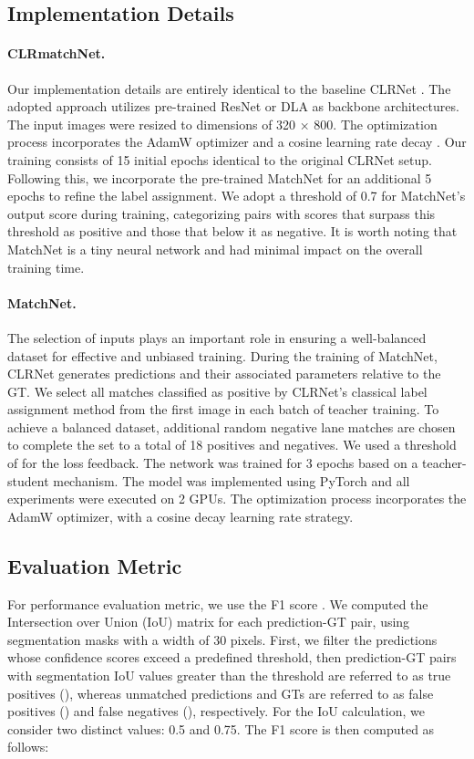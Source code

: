 \documentclass[10pt,twocolumn,letterpaper]{article}
\begin{document}
\subsection{Implementation Details}
\paragraph{CLRmatchNet.}Our implementation details are entirely identical to the baseline CLRNet \cite{CLRNet}. The adopted approach utilizes pre-trained ResNet \cite{resnet} or DLA \cite{DLA} as backbone architectures. The input images were resized to dimensions of 320 × 800. The optimization process incorporates the AdamW \cite{Adam} optimizer and a cosine learning rate decay \cite{Decay}. Our training consists of 15 initial epochs identical to the original CLRNet setup. Following this, we incorporate the pre-trained MatchNet for an additional 5 epochs to refine the label assignment. We adopt a threshold of 0.7 for MatchNet's output score during training, categorizing pairs with scores that surpass this threshold as positive and those that below it as negative. It is worth noting that MatchNet is a tiny neural network and had minimal impact on the overall training time.
 
\paragraph{\textbf{MatchNet.}} The selection of inputs plays an important role in ensuring a well-balanced dataset for effective and unbiased training. During the training of MatchNet, CLRNet generates predictions and their associated parameters relative to the GT. We select all matches classified as positive by CLRNet's classical label assignment method from the first image in each batch of teacher training. To achieve a balanced dataset, additional random negative lane matches are chosen to complete the set to a total of 18 positives and negatives. We used a threshold of  for the loss feedback. The network was trained for 3 epochs based on a teacher-student mechanism. The model was implemented using PyTorch and all experiments were executed on 2 GPUs. The optimization process incorporates the AdamW optimizer, with a cosine decay learning rate strategy. 
 
\subsection{\textbf{Evaluation Metric}} 
For performance evaluation metric, we use the F1 score \cite{CULane_F1}. We computed the Intersection over Union (IoU) matrix for each prediction-GT pair, using segmentation masks with a width of 30 pixels. First, we filter the predictions whose confidence scores exceed a predefined threshold, then prediction-GT pairs with segmentation IoU values greater than the threshold   are referred to as true positives (), whereas unmatched predictions and GTs are referred to as false positives () and false negatives (), respectively. For the IoU calculation, we consider two distinct  values: 0.5 and 0.75. The F1 score is then computed as follows:
\end{document}

